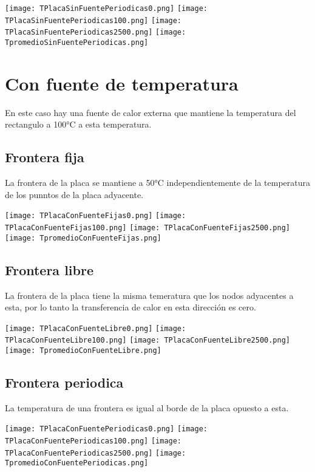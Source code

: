 \documentclass[11pt, spanish]{article}
\begin{document}
\texttt{[image: TPlacaSinFuentePeriodicas0.png]}
\texttt{[image: TPlacaSinFuentePeriodicas100.png]}
\texttt{[image: TPlacaSinFuentePeriodicas2500.png]}
\texttt{[image: TpromedioSinFuentePeriodicas.png]}

\section{Con fuente de temperatura}
En este caso hay una fuente de calor externa que mantiene la temperatura del rectangulo a 100°C a esta temperatura.
\subsection{Frontera fija}
La frontera de la placa se mantiene a 50°C independientemente de la temperatura de los punntos de la placa adyacente.

\texttt{[image: TPlacaConFuenteFijas0.png]}
\texttt{[image: TPlacaConFuenteFijas100.png]}
\texttt{[image: TPlacaConFuenteFijas2500.png]}
\texttt{[image: TpromedioConFuenteFijas.png]}

\subsection{Frontera libre}
La frontera de la placa tiene la misma temeratura que los nodos adyacentes a esta, por lo tanto la transferencia de calor en esta dirección es cero.

\texttt{[image: TPlacaConFuenteLibre0.png]}
\texttt{[image: TPlacaConFuenteLibre100.png]}
\texttt{[image: TPlacaConFuenteLibre2500.png]}
\texttt{[image: TpromedioConFuenteLibre.png]}

\subsection{Frontera periodica}
La temperatura de una frontera es igual al borde de la placa opuesto a esta.

\texttt{[image: TPlacaConFuentePeriodicas0.png]}
\texttt{[image: TPlacaConFuentePeriodicas100.png]}
\texttt{[image: TPlacaConFuentePeriodicas2500.png]}
\texttt{[image: TpromedioConFuentePeriodicas.png]}
\end{document}
